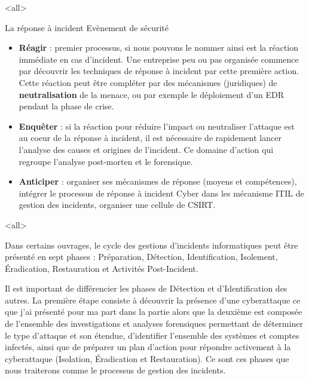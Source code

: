 \mode<all>{\texframe
{La réponse à incident}
{Evènement de sécurité}
{%
\begin{itemize}
  \item \textbf{Réagir} : premier processus, si nous pouvons le nommer ainsi est  la réaction immédiate en cas d'incident. Une entreprise peu ou pas organisée commence par découvrir les techniques de réponse à incident par cette première action. Cette réaction peut être compléter par des mécanismes (juridiques) de \textbf{neutralisation} de la menace, ou par exemple le déploiement d'un EDR pendant la phase de crise.

  \item \textbf{Enquêter} : si la réaction pour réduire l'impact ou neutraliser l'attaque est au coeur de la réponse à incident, il est nécessaire de rapidement lancer l'analyse des causes et origines de l'incident. Ce domaine d'action qui regroupe l'analyse post-morten et le forensique.

  \item \textbf{Anticiper} : organiser ses mécanismes de réponse (moyens et compétences), intégrer le processus de réponse à incident Cyber dans les mécanisme ITIL de gestion des incidents, organiser une cellule de CSIRT.

\end{itemize}
}} %

\mode<all>{}


Dans certains ouvrages, le cycle des gestions d’incidents informatiques  peut être  présenté  en sept phases : Préparation, Détection, Identification, Isolement, Éradication, Restauration et Activités Post-Incident. 

Il est important de différencier les phases de Détection et d’Identification des autres.  La première étape consiste à découvrir la présence d’une cyberattaque ce que j'ai présenté pour ma part dans la partie   alors que la deuxième est composée de l’ensemble des investigations et analyses forensiques permettant de déterminer le type d’attaque et son étendue, d’identifier l’ensemble des systèmes et comptes infectés, ainsi que de préparer un plan d’action pour répondre activement à la cyberattaque (Isolation, Éradication et Restauration). Ce sont ces phases que nous traiterons comme le processus de gestion des incidents.








